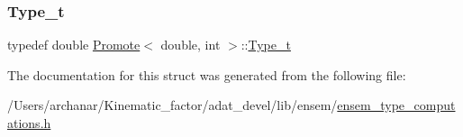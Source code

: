 \subsubsection{\texorpdfstring{Type\_t}{Type\_t}\hspace{0.1cm}{\footnotesize\ttfamily [2/2]}}
{\footnotesize\ttfamily typedef double \mbox{\hyperlink{structPromote}{Promote}}$<$ double, int $>$\+::\mbox{\hyperlink{structPromote_3_01double_00_01int_01_4_a55905f49138ff7e74738c0975fbfe652}{Type\+\_\+t}}}



The documentation for this struct was generated from the following file\+:\begin{DoxyCompactItemize}
\item 
/\+Users/archanar/\+Kinematic\+\_\+factor/adat\+\_\+devel/lib/ensem/\mbox{\hyperlink{lib_2ensem_2ensem__type__computations_8h}{ensem\+\_\+type\+\_\+computations.\+h}}\end{DoxyCompactItemize}
